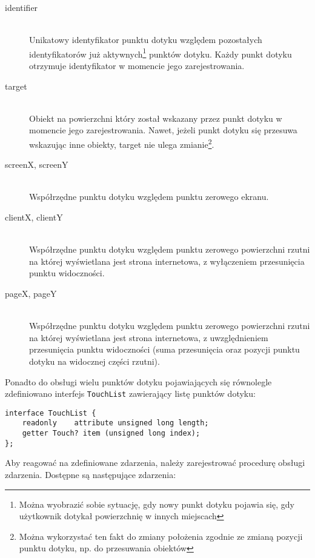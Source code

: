 \begin{description}
  \item[identifier] \hfill \\
  Unikatowy identyfikator punktu dotyku względem pozostałych identyfikatorów już aktywnych\footnote{Można wyobrazić sobie sytuację, gdy nowy punkt dotyku pojawia się, gdy użytkownik dotykał powierzchnię w innych miejscach} punktów dotyku. Każdy punkt dotyku otrzymuje identyfikator w momencie jego zarejestrowania.
  \item[target] \hfill \\
  Obiekt na powierzchni który został wskazany przez punkt dotyku w momencie jego zarejestrowania. Nawet, jeżeli punkt dotyku się przesuwa wskazując inne obiekty, target nie ulega zmianie\footnote{Można wykorzystać ten fakt do zmiany położenia zgodnie ze zmianą pozycji punktu dotyku, np. do przesuwania obiektów}.
  \item[screenX, screenY] \hfill \\
  Współrzędne punktu dotyku względem punktu zerowego ekranu.
  \item[clientX, clientY] \hfill \\
  Współrzędne punktu dotyku względem punktu zerowego powierzchni rzutni na której wyświetlana jest strona internetowa, z wyłączeniem przesunięcia punktu widoczności.
  \item[pageX, pageY] \hfill \\
  Współrzędne punktu dotyku względem punktu zerowego powierzchni rzutni na której wyświetlana jest strona internetowa, z uwzględnieniem przesunięcia punktu widoczności (suma przesunięcia oraz pozycji punktu dotyku na widocznej części rzutni).
\end{description}

Ponadto do obsługi wielu punktów dotyku pojawiających się równolegle zdefiniowano interfejs \lstinline{TouchList} zawierający listę punktów dotyku:

\lstset{language=Octave}
\begin{lstlisting}
interface TouchList {
    readonly    attribute unsigned long length;
    getter Touch? item (unsigned long index);
};
\end{lstlisting}

Aby reagować na zdefiniowane zdarzenia, należy zarejestrować procedurę obsługi zdarzenia. Dostępne są następujące zdarzenia:

